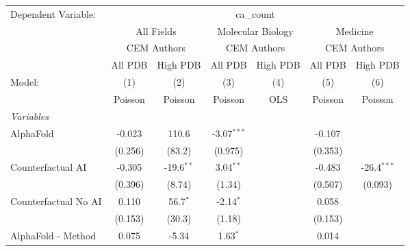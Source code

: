 \begingroup
\centering
\begin{tabular}{lcccccc}
   \tabularnewline \midrule \midrule
   Dependent Variable: & \multicolumn{6}{c}{ca\_count}\\
 & \multicolumn{2}{c}{All Fields} & \multicolumn{2}{c}{Molecular Biology} & \multicolumn{2}{c}{Medicine} \\
\cmidrule(lr){2-3} \cmidrule(lr){4-5} \cmidrule(lr){6-7}
 & \multicolumn{2}{c}{CEM Authors} & \multicolumn{2}{c}{CEM Authors} & \multicolumn{2}{c}{CEM Authors} \\
\cmidrule(lr){2-3} \cmidrule(lr){4-5} \cmidrule(lr){6-7}
 & \multicolumn{1}{c}{All PDB} & \multicolumn{1}{c}{High PDB} & \multicolumn{1}{c}{All PDB} & \multicolumn{1}{c}{High PDB} & \multicolumn{1}{c}{All PDB} & \multicolumn{1}{c}{High PDB} \\
\cmidrule(lr){2-2} \cmidrule(lr){3-3} \cmidrule(lr){4-4} \cmidrule(lr){5-5} \cmidrule(lr){6-6} \cmidrule(lr){7-7}
   Model:                                                     & (1)        & (2)          & (3)           & (4)  & (5)     & (6)\\  
                                                              &  Poisson   & Poisson      & Poisson       & OLS  & Poisson & Poisson\\  
   \midrule
   \emph{Variables}\\
   AlphaFold                                                  & -0.023     & 110.6        & -3.07$^{***}$ &      & -0.107  &   \\   
                                                              & (0.256)    & (83.2)       & (0.975)       &      & (0.353) &   \\   
   Counterfactual AI                                          & -0.305     & -19.6$^{**}$ & 3.04$^{**}$   &      & -0.483  & -26.4$^{***}$\\   
                                                              & (0.396)    & (8.74)       & (1.34)        &      & (0.507) & (0.093)\\   
   Counterfactual No AI                                       & 0.110      & 56.7$^{*}$   & -2.14$^{*}$   &      & 0.058   &   \\   
                                                              & (0.153)    & (30.3)       & (1.18)        &      & (0.153) &   \\   
   AlphaFold - Method                                         & 0.075      & -5.34        & 1.63$^{*}$    &      & 0.014   &   \\   

\end{tabular}
